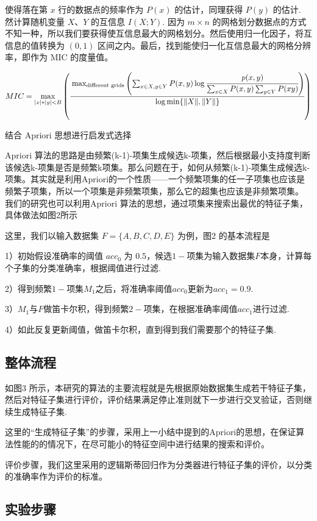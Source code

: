 \documentclass{njubachelor}
\begin{document}
使得落在第 $x$ 行的数据点的频率作为 $P(x)$ 的估计，同理获得 $P(y)$ 的估计. 然计算随机变量 $X$、$Y$ 的互信息 $I(X;Y)$. 因为 $m\times n$ 的网格划分数据点的方式不知一种，所以我们要获得使互信息最大的网格划分。然后使用归一化因子，将互信息的值转换为 $(0,1)$ 区间之内。最后，找到能使归一化互信息最大的网格分辨率，即作为 MIC 的度量值。

$$ MIC = 
\max_{|x|*|y|<B} 
\left(
    \cfrac{
        \max_{\text{different grids}}
        \left(
            \sum_{x\in X,y \in Y} P(x,y) \log\cfrac{p(x,y)}{\sum_{x\in X}P(x,y)\sum_{y\in Y}P(xy)}
        \right)}
        {\log \min\{\|X\|,\|Y\|\}}
\right) 
$$

结合 Apriori 思想进行启发式选择

Apriori 算法的思路是由频繁(k-1)-项集生成候选k-项集，然后根据最小支持度判断该候选k-项集是否是频繁k项集。那么问题在于，如何从频繁(k-1)-项集生成候选k-项集。其实就是利用Apriori的一个性质——一个频繁项集的任一子项集也应该是频繁子项集，所以一个项集是非频繁项集，那么它的超集也应该是非频繁项集。
我们的研究也可以利用Apriori 算法的思想，通过项集来搜索出最优的特征子集，具体做法如图2所示

这里，我们以输入数据集 $F=\{A,B,C,D,E\}$ 为例，图2 的基本流程是

1）初始假设准确率的阈值 $acc_0$ 为 $0.5$，候选$1-$项集为输入数据集$F$本身，计算每个子集的分类准确率，根据阈值进行过滤.

2）得到频繁$1-$项集$M_1$之后，将准确率阈值$acc_0$更新为$acc_1 = 0.9$.

3）$M_1$与$F$做笛卡尔积，得到频繁$2-$项集，在根据准确率阈值$acc_1$进行过滤.

4）如此反复更新阈值，做笛卡尔积，直到得到我们需要那个的特征子集.


\subsection{整体流程}
如图3 所示，本研究的算法的主要流程就是先根据原始数据集生成若干特征子集，然后对特征子集进行评价，评价结果满足停止准则就下一步进行交叉验证，否则继续生成特征子集.


这里的“生成特征子集”的步骤，采用上一小结中提到的Apriori的思想，在保证算法性能的的情况下，在尽可能小的特征空间中进行结果的搜索和评价。

评价步骤，我们这里采用的逻辑斯蒂回归作为分类器进行特征子集的评价，以分类的准确率作为评价的标准。

\subsection{实验步骤}
\end{document}
